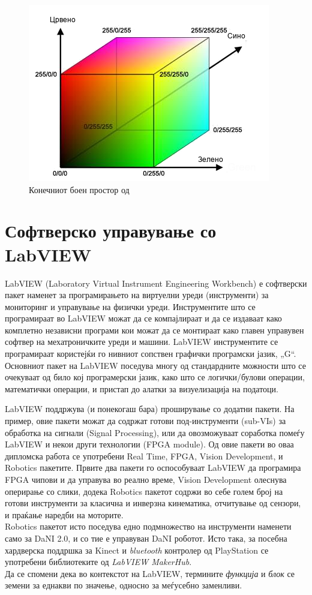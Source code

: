 \documentclass[12pt]{article}
\begin{document}
    \begin{figure}[h]
      \centering
      \includegraphics[width = 0.6\linewidth]{./images/colour_cube_mk.png}
      \caption{Конечниот боен простор од \cite{colourcube}}
      \label{fig:colour_cube_mk.png}

      \end{figure}

\newpage

\section{Софтверско управување со LabVIEW}
  LabVIEW (Laboratory Virtual Instrument Engineering Workbench) е софтверски пакет наменет за програмирањето на виртуелни уреди (инструменти) за мониторинг и управување на физички уреди. Инструментите што се програмираат во LabVIEW можат да се компајлираат и да се издаваат како комплетно независни програми кои можат да се монтираат како главен управувен софтвер на мехатроничките уреди и машини. LabVIEW инструментите се програмираат користејќи го нивниот сопствен графички програмски јазик, „G“.
  \\
  Основниот пакет на LabVIEW поседува многу од стандардните можности што се очекуваат од било кој програмерски јазик, како што се логички/булови операции, математички операции, и пристап до алатки за визуелизација на податоци.

  LabVIEW поддржува (и понекогаш бара) проширување со додатни пакети. На пример, овие пакети можат да содржат готови под-инструменти (sub-VIs) за обработка на сигнали (Signal Processing), или да овозможуваат соработка помеѓу LabVIEW и некои други технологии (FPGA module). Од овие пакети во оваа дипломска работа се употребени Real Time, FPGA, Vision Development, и Robotics пакетите. Првите два пакети го оспособуваат LabVIEW да програмира FPGA чипови и да управува во реално време, Vision Development олеснува оперирање со слики, додека Robotics пакетот содржи во себе голем број на готови инструменти за класична и инверзна кинематика, отчитување од сензори, и праќање наредби на моторите.
  \\
  Robotics пакетот исто поседува едно подмножество на инструменти наменети само за DaNI 2.0, и со тие е управуван DaNI роботот. Исто така, за посебна хардверска поддршка за Kinect и \textit{bluetooth} контролер од PlayStation се употребени библиотеките од \textit{LabVIEW MakerHub}.
  \\
  Да се спомени дека во контекстот на LabVIEW, термините \textit{функција} и \textit{блок} се земени за еднакви по значење, односно за меѓусебно заменливи.
\end{document}
